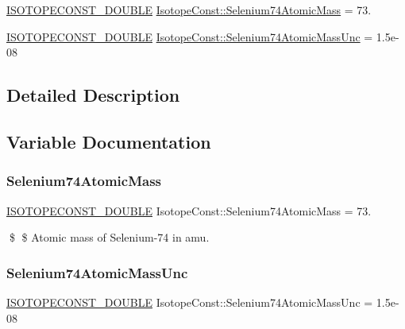 \begin{DoxyCompactItemize}
\item 
\mbox{\hyperlink{group___isotope_const-_macros_ga8f45a7272ce02c0b4c65c44636ed719a}{I\+S\+O\+T\+O\+P\+E\+C\+O\+N\+S\+T\+\_\+\+D\+O\+U\+B\+LE}} \mbox{\hyperlink{group___isotope_const-_selenium-_se74_ga2c97fa8a544babe1399145be39e6c0ed}{Isotope\+Const\+::\+Selenium74\+Atomic\+Mass}} = 73.
\item 
\mbox{\hyperlink{group___isotope_const-_macros_ga8f45a7272ce02c0b4c65c44636ed719a}{I\+S\+O\+T\+O\+P\+E\+C\+O\+N\+S\+T\+\_\+\+D\+O\+U\+B\+LE}} \mbox{\hyperlink{group___isotope_const-_selenium-_se74_gacdf4daf914385c2e40ca611ec8942c48}{Isotope\+Const\+::\+Selenium74\+Atomic\+Mass\+Unc}} = 1.\+5e-\/08
\end{DoxyCompactItemize}


\subsection{Detailed Description}


\subsection{Variable Documentation}
\mbox{\label{group___isotope_const-_selenium-_se74_ga2c97fa8a544babe1399145be39e6c0ed}} 
\subsubsection{\texorpdfstring{Selenium74\+Atomic\+Mass}{Selenium74AtomicMass}}
{\footnotesize\ttfamily \mbox{\hyperlink{group___isotope_const-_macros_ga8f45a7272ce02c0b4c65c44636ed719a}{I\+S\+O\+T\+O\+P\+E\+C\+O\+N\+S\+T\+\_\+\+D\+O\+U\+B\+LE}} Isotope\+Const\+::\+Selenium74\+Atomic\+Mass = 73.}

\$ \$ Atomic mass of Selenium-\/74 in amu. \mbox{\label{group___isotope_const-_selenium-_se74_gacdf4daf914385c2e40ca611ec8942c48}} 
\subsubsection{\texorpdfstring{Selenium74\+Atomic\+Mass\+Unc}{Selenium74AtomicMassUnc}}
{\footnotesize\ttfamily \mbox{\hyperlink{group___isotope_const-_macros_ga8f45a7272ce02c0b4c65c44636ed719a}{I\+S\+O\+T\+O\+P\+E\+C\+O\+N\+S\+T\+\_\+\+D\+O\+U\+B\+LE}} Isotope\+Const\+::\+Selenium74\+Atomic\+Mass\+Unc = 1.\+5e-\/08}

